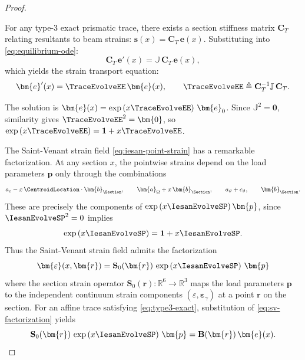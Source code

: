 \begin{proof}
\begin{Aside}
For any type-3 exact prismatic trace, there exists a section stiffness matrix 
$\mathbf{C}_T$ relating resultants to beam strains: $\bm{s}(x) = \mathbf{C}_T\,\bm{e}(x)$. 
Substituting into \eqref{eq:equilibrium-ode}:
\begin{equation*}
\mathbf{C}_T\,\bm{e}'(x) = \mathbb{J}\,\mathbf{C}_T\,\bm{e}(x),
\end{equation*}
which yields the strain transport equation:
\begin{equation*}
\bm{e}'(x) = \TraceEvolveEE\,\bm{e}(x), 
\qquad 
\TraceEvolveEE \triangleq \mathbf{C}_T^{-1}\mathbb{J}\,\mathbf{C}_T.
\end{equation*}

The solution is $\bm{e}(x) = \exp\left(x\TraceEvolveEE\right)\,\bm{e}_0$. 
Since $\mathbb{J}^2 = \bm{0}$, 
similarity gives $\TraceEvolveEE^2 = \bm{0}$, so 
$\exp\left(x\TraceEvolveEE\right) = \mathbf{1} + x\TraceEvolveEE$.
\end{Aside}
The Saint-Venant strain field \eqref{eq:iesan-point-strain} has a remarkable 
factorization. At any section $x$, the pointwise strains depend on the load 
parameters \(\bm{p}\) only through the combinations
\begin{equation*}
a_\varepsilon - x\,\CentroidLocation \cdot \bm{b}_{\Section}, \qquad 
\bm{a}_\Omega + x\,\bm{b}_{\Section}, \qquad 
a_\vartheta + c_\vartheta, \qquad 
\bm{b}_{\Section}.
\end{equation*}
These are precisely the components of $\exp\left(x\IesanEvolveSP\right)\bm{p}$, since 
$\IesanEvolveSP^2 = 0$ implies
%
\begin{equation*}
\exp\left(x\IesanEvolveSP\right) = \mathbf{1} + x\IesanEvolveSP.
\end{equation*}
%
Thus the Saint-Venant strain field admits the factorization
\begin{equation}
\bm{\varepsilon}(x, \bm{r}) = \mathbf{S}_0(\bm{r})\,\exp\left(x\IesanEvolveSP\right)\,\bm{p}
\label{eq:sv-factorization}
\end{equation}
where the section strain operator $\mathbf{S}_0(\bm{r}): \mathbb{R}^6 \to \mathbb{R}^3$ 
maps the load parameters \(\bm p\) to the independent continuum strain components 
$(\varepsilon, \bm{\varepsilon}_\gamma)$ at a point $\bm{r}$ on the section. 
%
For an affine trace satisfying \eqref{eq:type3-exact}, substitution of \eqref{eq:sv-factorization} yields
\begin{equation*}
\mathbf{S}_0(\bm{r})\,\exp\left(x\IesanEvolveSP\right)\,\bm{p} = \mathbf{B}(\bm{r})\,\bm{e}(x).

\end{equation*}
\end{proof}
